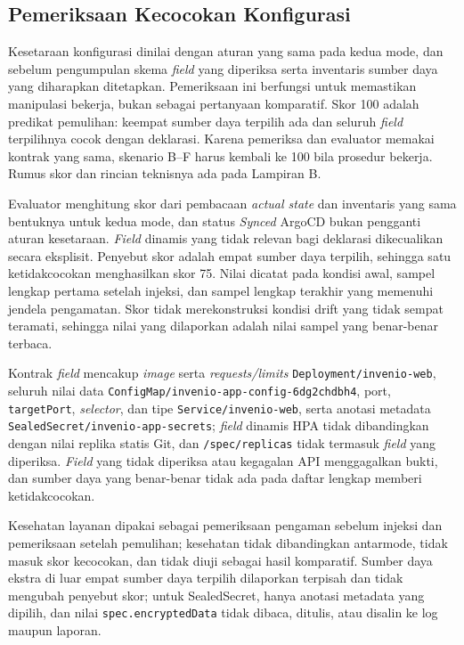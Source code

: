 \subsection{Pemeriksaan Kecocokan Konfigurasi}
\label{subsec:kecocokan-konfigurasi}

Kesetaraan konfigurasi dinilai dengan aturan yang sama pada kedua mode, dan sebelum pengumpulan skema \textit{field} yang diperiksa serta inventaris sumber daya yang diharapkan ditetapkan. Pemeriksaan ini berfungsi untuk memastikan manipulasi bekerja, bukan sebagai pertanyaan komparatif. Skor 100 adalah predikat pemulihan: keempat sumber daya terpilih ada dan seluruh \textit{field} terpilihnya cocok dengan deklarasi. Karena pemeriksa dan evaluator memakai kontrak yang sama, skenario B--F harus kembali ke 100 bila prosedur bekerja. Rumus skor dan rincian teknisnya ada pada Lampiran B.

Evaluator menghitung skor dari pembacaan \textit{actual state} dan inventaris yang sama bentuknya untuk kedua mode, dan status \textit{Synced} ArgoCD bukan pengganti aturan kesetaraan. \textit{Field} dinamis yang tidak relevan bagi deklarasi dikecualikan secara eksplisit. Penyebut skor adalah empat sumber daya terpilih, sehingga satu ketidakcocokan menghasilkan skor 75. Nilai dicatat pada kondisi awal, sampel lengkap pertama setelah injeksi, dan sampel lengkap terakhir yang memenuhi jendela pengamatan. Skor tidak merekonstruksi kondisi drift yang tidak sempat teramati, sehingga nilai yang dilaporkan adalah nilai sampel yang benar-benar terbaca.

Kontrak \textit{field} mencakup \textit{image} serta \textit{requests/limits} \texttt{Deployment/invenio-web}, seluruh nilai data \texttt{ConfigMap/invenio-app-config-6dg2chdbh4}, port, \texttt{targetPort}, \textit{selector}, dan tipe \texttt{Service/invenio-web}, serta anotasi metadata \texttt{SealedSecret/invenio-app-secrets}; \textit{field} dinamis HPA tidak dibandingkan dengan nilai replika statis Git, dan \texttt{/spec/replicas} tidak termasuk \textit{field} yang diperiksa. \textit{Field} yang tidak diperiksa atau kegagalan API menggagalkan bukti, dan sumber daya yang benar-benar tidak ada pada daftar lengkap memberi ketidakcocokan.

Kesehatan layanan dipakai sebagai pemeriksaan pengaman sebelum injeksi dan pemeriksaan setelah pemulihan; kesehatan tidak dibandingkan antarmode, tidak masuk skor kecocokan, dan tidak diuji sebagai hasil komparatif. Sumber daya ekstra di luar empat sumber daya terpilih dilaporkan terpisah dan tidak mengubah penyebut skor; untuk SealedSecret, hanya anotasi metadata yang dipilih, dan nilai \texttt{spec.encryptedData} tidak dibaca, ditulis, atau disalin ke log maupun laporan.

